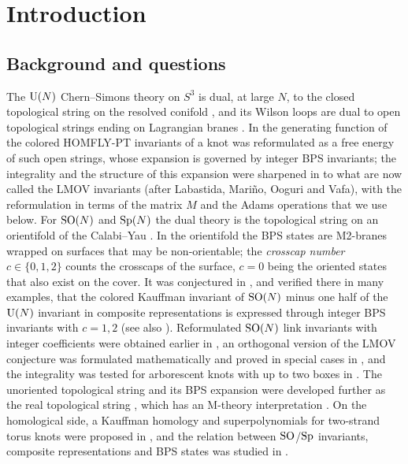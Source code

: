 \section{Introduction}\label{sec:intro}

\subsection{Background and questions}
The $\mathrm{U}(N)$ Chern--Simons theory on $S^3$ is dual, at large $N$, to the closed topological string on the resolved conifold \cite{GV98}, and its Wilson loops are dual to open topological strings ending on Lagrangian branes \cite{OV99}. In \cite{OV99} the generating function of the colored HOMFLY-PT invariants of a knot was reformulated as a free energy of such open strings, whose expansion is governed by integer BPS invariants; the integrality and the structure of this expansion were sharpened in \cite{LM00,LMV00,LM01} to what are now called the LMOV invariants (after Labastida, Mari\~no, Ooguri and Vafa), with the reformulation in terms of the matrix $M$ and the Adams operations that we use below. For $\mathrm{SO}(N)$ and $\mathrm{Sp}(N)$ the dual theory is the topological string on an orientifold of the Calabi--Yau \cite{SV00}. In the orientifold the BPS states are M2-branes wrapped on surfaces that may be non-orientable; the \emph{crosscap number} $c \in \{0, 1, 2\}$ counts the crosscaps of the surface, $c = 0$ being the oriented states that also exist on the cover. It was conjectured in \cite{Marino09}, and verified there in many examples, that the colored Kauffman invariant of $\mathrm{SO}(N)$ minus one half of the $\mathrm{U}(N)$ invariant in composite representations is expressed through integer BPS invariants with $c = 1, 2$ (see also \cite{BFM04,BFM05,PBR10,Stevan10,NRZ13}). Reformulated $\mathrm{SO}(N)$ link invariants with integer coefficients were obtained earlier in \cite{BR05}, an orthogonal version of the LMOV conjecture was formulated mathematically and proved in special cases in \cite{CC10}, and the integrality was tested for arborescent knots with up to two boxes in \cite{MMMRSS17}. The unoriented topological string and its BPS expansion were developed further as the real topological string \cite{Walcher07,KW09}, which has an M-theory interpretation \cite{PU14}. On the homological side, a Kauffman homology and superpolynomials for two-strand torus knots were proposed in \cite{GW05}, and the relation between $\mathrm{SO}$/$\mathrm{Sp}$ invariants, composite representations and BPS states was studied in \cite{GS11}.

